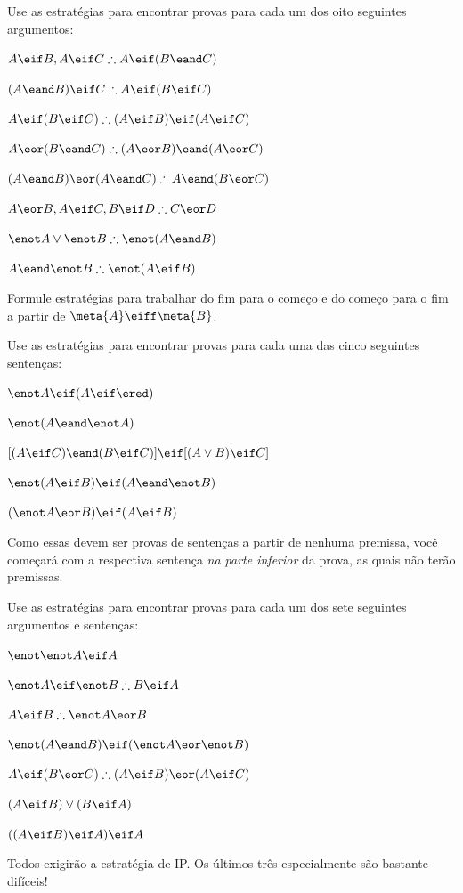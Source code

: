 
\practiceproblems

\problempart
Use as estratégias  para encontrar provas para cada um dos oito seguintes argumentos:
\begin{earg}
\item $A \eif B, A \eif C \therefore A \eif (B \eand C)$
\item $(A \eand B) \eif C \therefore A \eif (B \eif C)$
\item $A \eif (B \eif C) \therefore (A \eif B) \eif (A \eif C)$
\item $A \eor (B \eand C) \therefore (A \eor B) \eand (A \eor C)$
\item $(A \eand B) \eor (A \eand C) \therefore A \eand (B \eor C)$
\item $A \eor B, A \eif C, B \eif D \therefore C \eor D$
\item $\enot A \lor \enot B \therefore \enot(A \eand B)$
\item $A \eand \enot B \therefore \enot(A \eif B)$
\end{earg}

\problempart
Formule estratégias para trabalhar do fim para o começo e do começo para o fim a partir de $\meta{A} \eiff \meta{B}$.

\problempart
Use as estratégias para encontrar provas para cada uma das cinco seguintes sentenças:
\begin{earg}
\item $\enot A \eif (A \eif \ered)$
\item $\enot(A \eand \enot A)$
\item $[(A \eif C) \eand (B \eif C)] \eif [(A \lor B) \eif C]$
\item $\enot(A \eif B) \eif (A \eand \enot B)$
\item $(\enot A \eor B) \eif (A \eif B)$
\end{earg}


Como essas devem ser provas de sentenças a partir de nenhuma premissa, você começará com a respectiva sentença \emph{na parte inferior} da prova, as quais não terão premissas.

\problempart
Use as estratégias para encontrar provas para cada um dos sete seguintes argumentos e sentenças:
\begin{earg}
\item $\enot\enot A \eif A$
\item $\enot A \eif \enot B \therefore B \eif A$
\item $A \eif B \therefore \enot A \eor B$
\item $\enot(A \eand B) \eif (\enot A \eor \enot B)$
\item $A \eif (B \eor C) \therefore (A \eif B) \eor (A \eif C)$
\item $(A \eif B) \lor (B \eif A)$
\item $((A \eif B) \eif A) \eif A$
\end{earg}
Todos exigirão a estratégia de IP. Os últimos três especialmente são bastante difíceis!

